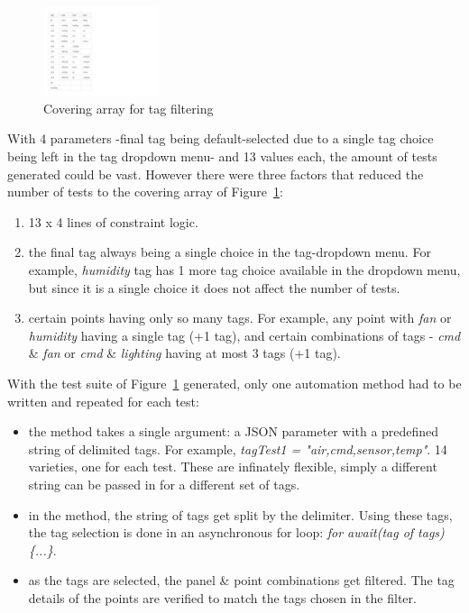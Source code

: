 \documentclass[conference]{IEEEtran}
\begin{document}
	\begin{figure}[!b]
		\centering
		\includegraphics[width=0.30\textwidth,]{tagFilterCoveringArray.pdf}
		\caption{Covering array for tag filtering}
		\label{fig:tagFilterCoveringArray}
	\end{figure}


	With 4 parameters -final tag being default-selected due to a single tag choice being left in the tag dropdown menu- and 13 values each, the amount of tests generated could be vast. 
	However there were three factors that reduced the number of tests to the covering array of Figure~\ref{fig:tagFilterCoveringArray}:
	
	\begin{enumerate}
		\item 13 x 4 lines of constraint logic.
		\item the final tag always being a single choice in the tag-dropdown menu. For example, \textit{humidity} tag has 1 more tag choice available in the dropdown menu, but since it is a single choice it does not affect  the number of tests.
		\item certain points having only so many tags. For example, any point with \textit{fan} or \textit{humidity} having a single tag (+1 tag), and certain combinations of tags - \textit{cmd} \& \textit{fan} or \textit{cmd} \& \textit{lighting} having at most 3 tags (+1 tag).
	\end{enumerate}

	With the test suite of Figure~\ref{fig:tagFilterCoveringArray} generated, only one automation method had to be written and repeated for each test:
	
	\begin{itemize}
		\item the method takes a single argument: a JSON parameter with a predefined string of delimited tags. For example, \textit{tagTest1 = "air,cmd,sensor,temp"}. 14 varieties, one for each test. These are infinately flexible, simply a different string can be passed in for a different set of tags.
		\item in the method, the string of tags get split by the delimiter. Using these tags, the tag selection is done in an asynchronous for loop: \emph{for await(tag of tags) \{...\}}. 
		\item as the tags are selected, the panel \& point combinations get filtered. The tag details of the points are verified to match the tags chosen in the filter.
	\end{itemize}
	
\end{document}
